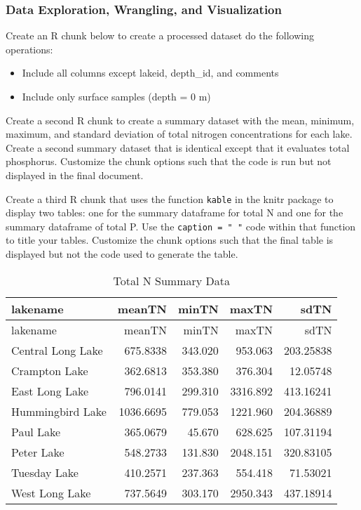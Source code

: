 \documentclass[]{article}
\providecommand{\tightlist}{%
  \setlength{\itemsep}{0pt}\setlength{\parskip}{0pt}}
\begin{document}
\subsubsection{Data Exploration, Wrangling, and
Visualization}\label{data-exploration-wrangling-and-visualization}

Create an R chunk below to create a processed dataset do the following
operations:

\begin{itemize}
\tightlist
\item
  Include all columns except lakeid, depth\_id, and comments
\item
  Include only surface samples (depth = 0 m)
\end{itemize}

Create a second R chunk to create a summary dataset with the mean,
minimum, maximum, and standard deviation of total nitrogen
concentrations for each lake. Create a second summary dataset that is
identical except that it evaluates total phosphorus. Customize the chunk
options such that the code is run but not displayed in the final
document.

Create a third R chunk that uses the function \texttt{kable} in the
knitr package to display two tables: one for the summary dataframe for
total N and one for the summary dataframe of total P. Use the
\texttt{caption\ =\ "\ "} code within that function to title your
tables. Customize the chunk options such that the final table is
displayed but not the code used to generate the table.

\begin{longtable}[]{@{}lrrrr@{}}
\caption{Total N Summary Data}\tabularnewline
\toprule
lakename & meanTN & minTN & maxTN & sdTN\tabularnewline
\midrule
\endfirsthead
\toprule
lakename & meanTN & minTN & maxTN & sdTN\tabularnewline
\midrule
\endhead
Central Long Lake & 675.8338 & 343.020 & 953.063 &
203.25838\tabularnewline
Crampton Lake & 362.6813 & 353.380 & 376.304 & 12.05748\tabularnewline
East Long Lake & 796.0141 & 299.310 & 3316.892 &
413.16241\tabularnewline
Hummingbird Lake & 1036.6695 & 779.053 & 1221.960 &
204.36889\tabularnewline
Paul Lake & 365.0679 & 45.670 & 628.625 & 107.31194\tabularnewline
Peter Lake & 548.2733 & 131.830 & 2048.151 & 320.83105\tabularnewline
Tuesday Lake & 410.2571 & 237.363 & 554.418 & 71.53021\tabularnewline
West Long Lake & 737.5649 & 303.170 & 2950.343 &
437.18914\tabularnewline
\bottomrule
\end{longtable}
\end{document}
